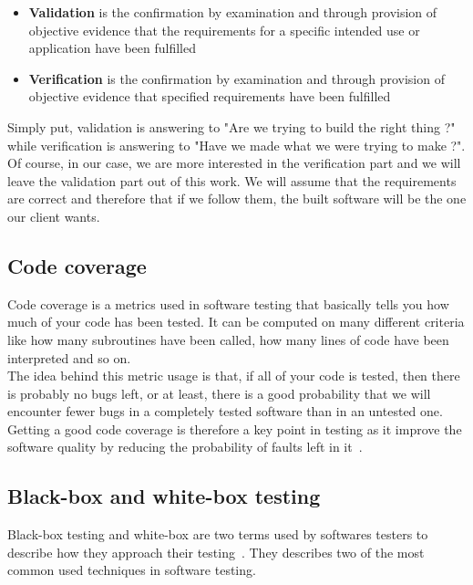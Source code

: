 \documentclass[12pt]{article}
\theoremstyle{definition}
\theoremstyle{definition}
\begin{document}
\begin{itemize}

\item \textbf{Validation} is the confirmation by examination and through provision of objective evidence that the requirements for a specific intended use or application have been fulfilled~\cite{IEEEStd1990}
\item \textbf{Verification} is the confirmation by examination and through provision of objective evidence that specified requirements have been fulfilled~\cite{IEEEStd1990}

\end{itemize}

Simply put, validation is answering to "Are we trying to build the right thing ?" while verification is answering to "Have we made what we were trying to make ?". Of course, in our case, we are more interested in the verification part and we will leave the validation part out of this work. We will assume that the requirements are correct and therefore that if we follow them, the built software will be the one our client wants.

\subsection{Code coverage}

Code coverage is a metrics used in software testing that basically tells you how much of your code has been tested. It can be computed on many different criteria like how many subroutines have been called, how many lines of code have been interpreted and so on.\\

The idea behind this metric usage is that, if all of your code is tested, then there is probably no bugs left, or at least, there is a good probability that we will encounter fewer bugs in a completely tested software than in an untested one. Getting a good code coverage is therefore a key point in testing as it improve the software quality by reducing the probability of faults left in it~\cite{TestingForContinuousDelivery:2016}.

\subsection{Black-box and white-box testing}

Black-box testing and white-box are two terms used by softwares testers to describe how they approach their testing~\cite{Patton:2005}. They describes two of the most common used techniques in software testing.
\end{document}
